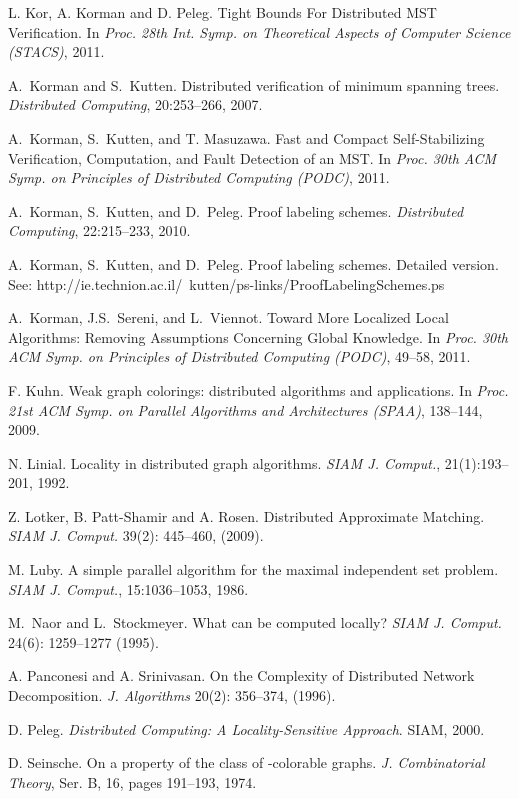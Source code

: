 \documentclass{llncs}
\begin{document}
\begin{thebibliography}{99}
L. Kor, A. Korman and D. Peleg.
\newblock  Tight Bounds For Distributed MST Verification.
\newblock In \emph{Proc. 28th Int. Symp. on Theoretical Aspects of
Computer Science (STACS)}, 2011.

A.~Korman and S.~Kutten.
\newblock Distributed verification of minimum spanning trees.
\newblock \emph{Distributed Computing}, 20:253--266, 2007.

A.~Korman,  S.~Kutten, and T. Masuzawa.
\newblock Fast and Compact Self-Stabilizing  Verification, Computation, and Fault Detection of an MST.
\newblock In \emph{Proc. 30th ACM Symp. on Principles of Distributed Computing (PODC)}, 2011.

A.~Korman, S.~Kutten, and D.~Peleg.
\newblock Proof labeling schemes.
\newblock \emph{Distributed Computing}, 22:215--233, 2010.

A.~Korman, S.~Kutten, and D.~Peleg.
\newblock Proof labeling schemes.
\newblock Detailed version. See: http://ie.technion.ac.il/~kutten/ps-links/ProofLabelingSchemes.ps

A.~Korman, J.S.~Sereni, and L.~Viennot.
\newblock
Toward More Localized Local Algorithms: Removing Assumptions Concerning Global Knowledge.
\newblock In \emph{Proc. 30th ACM Symp. on Principles of Distributed Computing (PODC)}, 49--58, 2011.

F. Kuhn.
\newblock Weak graph colorings: distributed algorithms and applications.
\newblock In \emph{Proc. 21st ACM Symp. on Parallel Algorithms and Architectures
(SPAA)}, 138--144, 2009.

N. Linial.
\newblock Locality in distributed graph algorithms.
\newblock \emph{SIAM J.  Comput.}, 21(1):193--201, 1992.

Z. Lotker, B. Patt-Shamir and A. Rosen.
\newblock Distributed Approximate Matching.
\newblock \emph{SIAM J. Comput.} 39(2): 445--460, (2009).

M. Luby.
\newblock A simple parallel algorithm for the maximal independent set problem.
\newblock \emph{SIAM J.  Comput.}, 15:1036--1053, 1986.

M.~Naor and L.~Stockmeyer.
\newblock What can be computed locally?
\newblock \emph{SIAM J. Comput.} 24(6): 1259--1277 (1995).

A. Panconesi and A. Srinivasan.
On the Complexity of Distributed Network Decomposition.
\newblock \emph{J. Algorithms} 20(2): 356--374, (1996).

D. Peleg.
\newblock \emph{Distributed Computing: A Locality-Sensitive Approach}.
\newblock SIAM, 2000.

D. Seinsche.
\newblock On a property of the class of -colorable graphs.
\newblock \emph{J. Combinatorial Theory}, Ser. B, 16,  pages 191--193, 1974.

\end{thebibliography}
\end{document}
